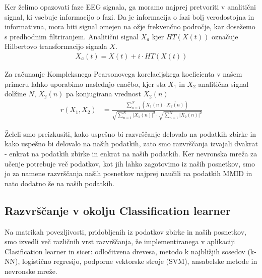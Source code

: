 Ker želimo opazovati faze EEG signala, ga moramo najprej pretvoriti v analitični signal, ki vsebuje informacijo o fazi. Da je informacija o fazi bolj verodostojna in informativna, mora biti signal omejen na ožje frekvenčno področje, kar dosežemo s predhodnim filtriranjem. Analitični signal $X_a$ kjer $HT(X(t))$ označuje Hilbertovo transformacijo signala $X$.\cite{sverkoComplexPearsonCorrelation2022} 
\begin{align*}
    X_a(t) = X(t) + i \cdot HT(X(t))
\end{align*}

Za računanje Kompleksnega Pearsonovega korelacijskega koeficienta v našem primeru lahko uporabimo naslednjo enačbo, kjer sta $X_1$ in $X_2$ analitična signal dolžine $N$, $\overline{X_2(n)}$ pa konjugirana vrednost $X_2(n)$ \cite{sverkoComplexPearsonCorrelation2022} 
\begin{align*}
r(X_1, X_2) &= \frac{\sum\limits_{n=1}^{N}(X_1(n) \cdot \overline{X_2(n)})}{\sqrt{\sum\limits_{n=1}^{N} |X_1(n)|^2} \cdot \sqrt{\sum\limits_{n=1}^{N} |X_2(n)|^2}}
\end{align*}

Želeli smo preizkusiti, kako uspešno bi razvrščanje delovalo na podatkih zbirke in kako uspešno bi delovalo na naših podatkih, zato smo razvrščanja izvajali dvakrat - enkrat na podatkih zbirke in enkrat na naših podatkih. Ker nevronska mreža za učenje potrebuje več podatkov, kot jih lahko zagotovimo iz naših posnetkov, smo jo za namene razvrščanja naših posnetkov najprej naučili na podatkih MMID in nato dodatno še na naših podatkih. 

\subsection{Razvrščanje v okolju Classification learner}
Na matrikah povezljivosti, pridobljenih iz podatkov zbirke in naših posnetkov, smo izvedli več različnih vrst razvrščanja, že implementiranega v aplikaciji Clasification learner in sicer: odločitvena drevesa, metodo k najbližjih sosedov (k-NN), logistično regresijo, podporne vektorske stroje (SVM), ansabelske metode in nevronske mreže.


